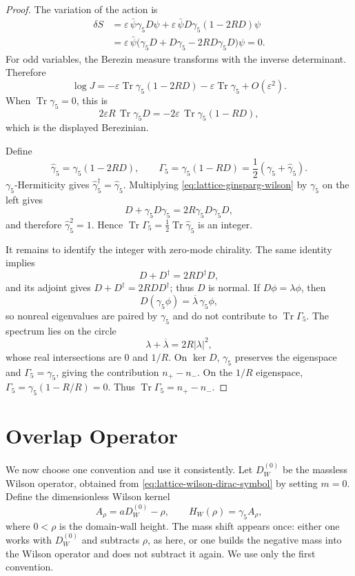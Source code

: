 \begin{proof}
The variation of the action is
\[
\begin{aligned}
  \delta S
  &=
  \varepsilon\,\bar\psi\gamma_5D\psi
  +
  \varepsilon\,\bar\psi D\gamma_5(1-2RD)\psi        \\
  &=
  \varepsilon\,\bar\psi
  \bigl(\gamma_5D+D\gamma_5-2R D\gamma_5D\bigr)\psi
  =
  0 .
\end{aligned}
\]
For odd variables, the Berezin measure transforms with the inverse
determinant.  Therefore
\[
  \log J
  =
  -\varepsilon\operatorname{Tr}\gamma_5(1-2RD)
  -\varepsilon\operatorname{Tr}\gamma_5
  +O(\varepsilon^2).
\]
When \(\operatorname{Tr}\gamma_5=0\), this is
\[
  2\varepsilon R\,\operatorname{Tr}\gamma_5D
  =
  -2\varepsilon\,\operatorname{Tr}\gamma_5(1-RD),
\]
which is the displayed Berezinian.

Define
\[
  \widehat\gamma_5=\gamma_5(1-2RD),
  \qquad
  \Gamma_5=\gamma_5(1-RD)=\frac12(\gamma_5+\widehat\gamma_5).
\]
\(\gamma_5\)-Hermiticity gives \(\widehat\gamma_5^\dagger=\widehat\gamma_5\).
Multiplying \eqref{eq:lattice-ginsparg-wilson} by \(\gamma_5\) on the left
gives
\[
  D+\gamma_5D\gamma_5=2R\gamma_5D\gamma_5D,
\]
and therefore \(\widehat\gamma_5^2=1\).  Hence
\(\operatorname{Tr}\Gamma_5=\frac12\operatorname{Tr}\widehat\gamma_5\) is an
integer.

It remains to identify the integer with zero-mode chirality.  The same
identity implies
\[
  D+D^\dagger=2R D^\dagger D,
\]
and its adjoint gives \(D+D^\dagger=2R DD^\dagger\); thus \(D\) is normal.
If \(D\phi=\lambda\phi\), then
\[
  D(\gamma_5\phi)=\overline{\lambda}\,\gamma_5\phi ,
\]
so nonreal eigenvalues are paired by \(\gamma_5\) and do not contribute to
\(\operatorname{Tr}\Gamma_5\).  The spectrum lies on the circle
\[
  \lambda+\overline{\lambda}=2R|\lambda|^2,
\]
whose real intersections are \(0\) and \(1/R\).  On \(\ker D\), \(\gamma_5\)
preserves the eigenspace and \(\Gamma_5=\gamma_5\), giving the contribution
\(n_+-n_-\).  On the \(1/R\) eigenspace, \(\Gamma_5=\gamma_5(1-R/R)=0\).
Thus \(\operatorname{Tr}\Gamma_5=n_+-n_-\).
\end{proof}

\section{Overlap Operator}

We now choose one convention and use it consistently.  Let
\(D_W^{(0)}\) be the massless Wilson operator, obtained from
\eqref{eq:lattice-wilson-dirac-symbol} by setting \(m=0\).  Define the
dimensionless Wilson kernel
\begin{equation}
  A_\rho=aD_W^{(0)}-\rho ,
  \qquad
  H_W(\rho)=\gamma_5A_\rho ,
  \label{eq:lattice-overlap-kernel-convention}
\end{equation}
where \(0<\rho\) is the domain-wall height.  The mass shift appears once:
either one works with \(D_W^{(0)}\) and subtracts \(\rho\), as here, or one
builds the negative mass into the Wilson operator and does not subtract it
again.  We use only the first convention.

